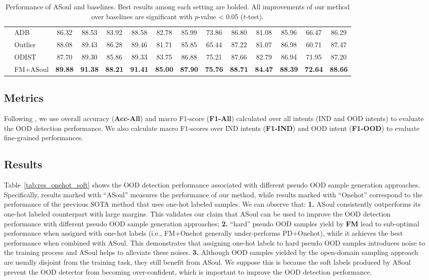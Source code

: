 \documentclass[11pt]{article}
\begin{document}
\begin{table}[t]
\begin{tabular}{cl|cccc|cccc|cccc}
    & ADB & 86.32  & 88.53 & 83.92 & 88.58  & 82.78 & 85.99 & 73.86 & 86.80 & 81.08 & 85.96 & 66.47 & 86.29\\
    & Outlier & 88.08 & 89.43 & 86.28 & 89.46 & 81.71 & 85.85 & 65.44 & 87.22 & 81.07 & 86.98 & 60.71 & 87.47\\
    & ODIST & 87.70 & 89.30 & 85.86 & 89.33 & 83.75 & 86.88 & 75.21 & 87.66 & 82.79 & 86.94 & 71.95 & 87.20\\
\cmidrule{2-14}
    & FM+ASoul & \textbf{89.88} & \textbf{91.38} & \textbf{88.21} & \textbf{91.41} & \textbf{85.00} & \textbf{87.90} & \textbf{75.76} & \textbf{88.71} & \textbf{84.47} & \textbf{88.39} & \textbf{72.64} & \textbf{88.66} \\
\bottomrule
\end{tabular}
\centering
\caption{Performance of ASoul and baselines. Best results among each setting are bolded. All improvements of our method over baselines are significant with $p$-value < 0.05 ($t$-test).}
\label{tab:baselines}
\end{table}

\subsection{Metrics}
Following \citet{zhang2021deep,zhan2021out,shu2021odist}, we use overall accuracy (\textbf{Acc-All}) and macro F1-score (\textbf{F1-All}) calculated over all intents (IND and OOD intents) to evaluate the OOD detection performance. We also calculate macro F1-scores over IND intents (\textbf{F1-IND}) and OOD intent (\textbf{F1-OOD}) to evaluate fine-grained performances.

\subsection{Results}
Table~\ref{tab:res_onehot_soft} shows the OOD detection performance associated with different pseudo OOD sample generation approaches.
Specifically, results marked with ``ASoul'' measures the performance of our method, 
while results marked with ``Onehot'' correspond to the performance of the previous SOTA method \cite{shu2021odist} that uses one-hot labeled samples.
We can observe that:
\textbf{1.} ASoul consistently outperforms its one-hot labeled counterpart with large margins.
This validates our claim that ASoul can be used to improve the OOD detection performance with different pseudo OOD sample generation approaches;
\textbf{2.} ``hard'' pseudo OOD samples yield by \textbf{FM} lead to sub-optimal performance when assigned with one-hot labels (i.e., FM+Onehot generally under-performs PD+Onehot),
while it achieves the best performance when combined with ASoul.
This demonstrates that assigning one-hot labels to hard pseudo OOD samples introduces noise to the training process and ASoul helps to alleviate these noises. 
\textbf{3.} Although OOD samples yielded by the open-domain sampling approach are usually disjoint from the training task, they still benefit from ASoul.
We suppose this is because the soft labels produced by ASoul prevent the OOD detector from becoming over-confident, which is important to improve the OOD detection performance.
\end{document}
